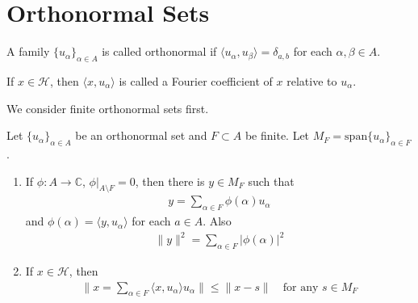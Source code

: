 \section{Orthonormal Sets}
\begin{definition}
  A family $\{ u_\alpha \}_{\alpha \in A}$ is called orthonormal if $
  \langle u_\alpha ,  u_\beta \rangle = \delta_{a, b}$ for each
  $\alpha, \beta \in A$.

  If $x \in \mathcal{H}$, then $\langle  x , u_\alpha \rangle $ is
  called a Fourier coefficient of $x$ relative to $u_\alpha$.
\end{definition}

We consider finite orthonormal sets first.
\begin{proposition}
  Let $\{ u_\alpha \}_{\alpha \in A}$ be an orthonormal set and $ F
  \subset A$ be finite. Let $M_F = \textrm{span}\{ u_\alpha \}_{\alpha \in F}$.
  \begin{enumerate}[label=(\alph*)]
    \item  If $\phi: A \to \mathbb{C}$, $\phi|_{A \setminus F}  = 0$,
      then there is $ y \in M_F$ such that
      \begin{align*}
        y = \sum_{\alpha \in  F} \phi(\alpha)   u_\alpha
      \end{align*}
      and $\phi(\alpha) = \langle y , u_\alpha \rangle $ for each $a
      \in A$. Also
      \begin{align*}
        \|y\|^2 = \sum_{\alpha \in  F} |\phi(\alpha)|^2
      \end{align*}

    \item If $x \in \mathcal{H}$, then
      \begin{align*}
        \Big \| x = \sum_{\alpha \in  F} \langle x , u_\alpha \rangle
        u_\alpha \Big \| \le \|x - s\| \quad \textrm{for any } s \in M_F
      \end{align*}
  \end{enumerate}
\end{proposition}
